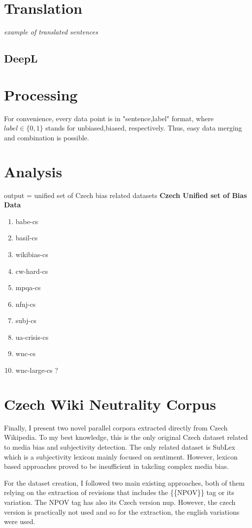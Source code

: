 \section{Translation}

\textit{example of translated sentences}
\subsection{DeepL}
\section{Processing}\label{processing}
For convenience, every data point is in "sentence,label" format, where $label \in \{0,1\}$ stands for unbiased,biased, respectively. Thus, easy data merging and combination is possible.
\section{Analysis}
output = unified set of Czech bias related datasets\label{f}
\textbf{Czech Unified set of Bias Data}
\begin{enumerate}
    \item babe-cs
    \item basil-cs
    \item wikibias-cs
    \item cw-hard-cs
    \item mpqa-cs
    \item nfnj-cs
    \item subj-cs
    \item ua-crisis-cs
    \item wnc-cs
    \item wnc-large-cs ?
\end{enumerate}

\newpage

\section{Czech Wiki Neutrality Corpus}
Finally, I present two novel parallel corpora extracted directly from Czech Wikipedia. To my best knowledge, this is the only original Czech dataset related to media bias and subjectivity detection. The only related dataset is SubLex which is a subjectivity lexicon mainly focused on sentiment. However, lexicon based approaches proved to be insufficient in takcling complex media bias.

For the dataset creation, I followed two main existing approaches, both of them relying on the extraction of revisions that includes the \{\{NPOV\}\} tag or its variation. The NPOV tag has also its Czech version \Gls{nup}. However, the czech version is practically not used and so for the extraction, the english variations were used.

